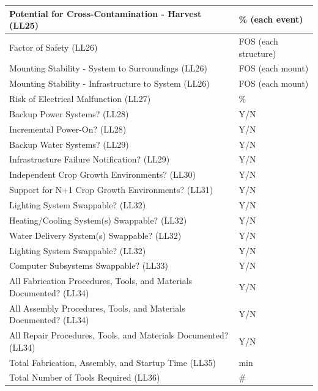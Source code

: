 \documentclass{report}
\newcounter{metricnumber}
\newcommand\rownumber{\stepcounter{metricnumber}\arabic{metricnumber}}
\begin{document}
\begin{tabular}{| @{\makebox[2em][l]{\rownumber}} | l | l |}
    \hline
    Potential for Cross-Contamination - Harvest \hfill (LL25) & \% (each event)\\
    \hline
    Factor of Safety \hfill (LL26) & FOS (each structure)\\
    \hline
    Mounting Stability - System to Surroundings \hfill (LL26) & FOS (each mount) \\
    \hline
    Mounting Stability - Infrastructure to System \hfill (LL26) & FOS (each mount) \\
    \hline
    Risk of Electrical Malfunction \hfill (LL27) & \% \\
    \hline
    Backup Power Systems? \hfill (LL28) & Y/N \\
    \hline
    Incremental Power-On? \hfill (LL28) & Y/N \\
    \hline
    Backup Water Systems? \hfill (LL29) & Y/N \\
    \hline
    Infrastructure Failure Notification? \hfill (LL29) & Y/N \\
    \hline
    Independent Crop Growth Environments? \hfill (LL30) & Y/N \\
    \hline
    Support for N+1 Crop Growth Environments? \hfill (LL31) & Y/N \\
    \hline
    Lighting System Swappable? \hfill (LL32) & Y/N \\
    \hline
    Heating/Cooling System(s) Swappable? \hfill (LL32) & Y/N \\
    \hline
    Water Delivery System(s) Swappable? \hfill (LL32) & Y/N \\
    \hline
    Lighting System Swappable? \hfill (LL32) & Y/N \\
    \hline
    Computer Subsystems Swappable? \hfill (LL33) & Y/N \\
    \hline
    All Fabrication Procedures, Tools, and Materials Documented? \hfill (LL34) & Y/N \\
    \hline
    All Assembly Procedures, Tools, and Materials Documented? \hfill (LL34) & Y/N \\
    \hline
    All Repair Procedures, Tools, and Materials Documented? \hfill (LL34) & Y/N \\
    \hline
    Total Fabrication, Assembly, and Startup Time \hfill (LL35) & min \\
    \hline
    Total Number of Tools Required \hfill (LL36) & \# \\
    \hline
\end{tabular}

\newpage
\end{document}
